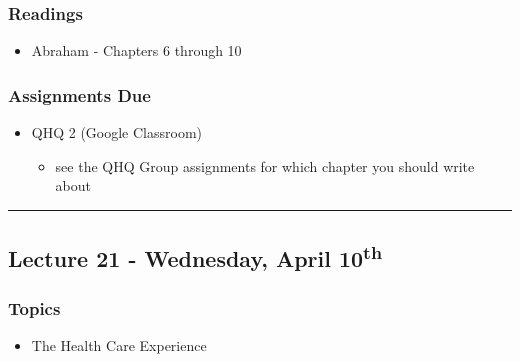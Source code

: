 \documentclass[]{book}
\providecommand{\tightlist}{%
  \setlength{\itemsep}{0pt}\setlength{\parskip}{0pt}}
\begin{document}
\hypertarget{readings-21}{%
\subsubsection*{Readings}\label{readings-21}}

\begin{itemize}
\tightlist
\item
  Abraham - Chapters 6 through 10
\end{itemize}

\hypertarget{assignments-due-6}{%
\subsubsection*{Assignments Due}\label{assignments-due-6}}

\begin{itemize}
\tightlist
\item
  QHQ 2 (Google Classroom)

  \begin{itemize}
  \tightlist
  \item
    see the QHQ Group assignments for which chapter you should write about
  \end{itemize}
\end{itemize}

\begin{center}\rule{0.5\linewidth}{\linethickness}\end{center}

\hypertarget{lecture-21---wednesday-april-10th}{%
\subsection*{\texorpdfstring{Lecture 21 - Wednesday, April 10\textsuperscript{th}}{Lecture 21 - Wednesday, April 10th}}\label{lecture-21---wednesday-april-10th}}

\hypertarget{topics-24}{%
\subsubsection*{Topics}\label{topics-24}}

\begin{itemize}
\tightlist
\item
  The Health Care Experience
\end{itemize}
\end{document}
